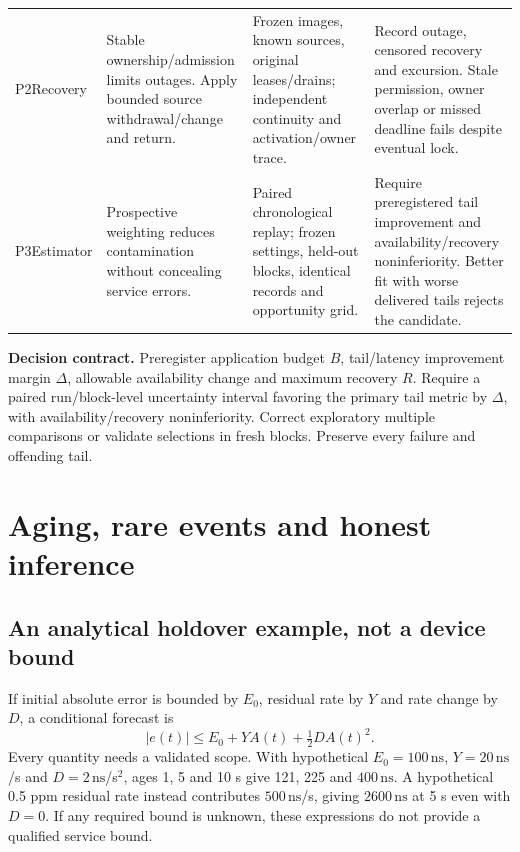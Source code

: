 \documentclass[11pt,letterpaper]{article}
\newcommand{\ns}{\,\mathrm{ns}}\newcommand{\us}{\,\mu\mathrm{s}}\newcommand{\ms}{\,\mathrm{ms}}
\begin{document}
\begin{center}
\begin{tabular}{L{.09\linewidth}L{.255\linewidth}L{.28\linewidth}L{.285\linewidth}}
P2\newline Recovery & Stable ownership/admission limits outages. Apply bounded source withdrawal/change and return. & Frozen images, known sources, original leases/drains; independent continuity and activation/owner trace. & Record outage, censored recovery and excursion. Stale permission, owner overlap or missed deadline fails despite eventual lock.\\
P3\newline Estimator & Prospective weighting reduces contamination without concealing service errors. & Paired chronological replay; frozen settings, held-out blocks, identical records and opportunity grid. & Require preregistered tail improvement and availability/recovery noninferiority. Better fit with worse delivered tails rejects the candidate.\\\bottomrule
\end{tabular}
\end{center}\vspace{-4pt}
\textbf{Decision contract.} Preregister application budget $B$, tail/latency improvement margin $\Delta$, allowable availability change and maximum recovery $R$. Require a paired run/block-level uncertainty interval favoring the primary tail metric by $\Delta$, with availability/recovery noninferiority. Correct exploratory multiple comparisons or validate selections in fresh blocks. Preserve every failure and offending tail.
\newpage
\section{Aging, rare events and honest inference}
\subsection{An analytical holdover example, not a device bound}
If initial absolute error is bounded by $E_0$, residual rate by $Y$ and rate change by $D$, a conditional forecast is
\[
 |e(t)|\le E_0+Y A(t)+\tfrac12 D A(t)^2.
\]
Every quantity needs a validated scope. With hypothetical $E_0=100\ns$, $Y=20\ns$/s and $D=2\ns$/s$^2$, ages 1, 5 and 10 s give 121, 225 and $400\ns$. A hypothetical 0.5 ppm residual rate instead contributes $500\ns$/s, giving $2600\ns$ at 5 s even with $D=0$. If any required bound is unknown, these expressions do not provide a qualified service bound.
\end{document}

